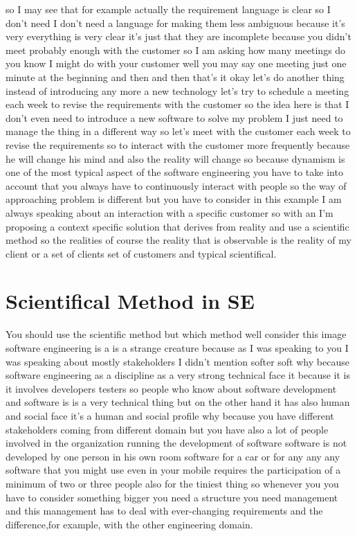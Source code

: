 \documentclass[conference, compsoc, twoside]{IEEEtran}
\begin{document}
so I may see that 
for example actually the requirement language is clear 
so I don't need I don't need a language for making them less ambiguous because it's very everything is very clear it's just that they are incomplete because you didn't meet probably enough with the customer 
so I am asking how many meetings do you know I might do with your customer well you may say one meeting just one minute at the beginning and then and then that's it okay let's do another thing instead of introducing any more a new technology let's try to schedule a meeting each week to revise the requirements with the customer so the idea here is that I don't even need to introduce a new software to solve my problem I just need to manage the thing in a different way so let's meet with the customer each week to revise the requirements so to interact with the customer more frequently because he will change his mind and also the reality will change so because dynamism is one of the most typical aspect of the software engineering you have to take into account that you always have to continuously interact with people so the way of approaching problem is different but you have to consider in this example I am always speaking about an interaction with a specific customer so with an I'm proposing a context specific solution that derives from reality and use a scientific method so the realities of course the reality that is observable is the reality of my client or a set of clients set of customers and typical scientifical. 
 \section{Scientifical Method in SE} %
 \label{sec:scientifical_method_in_se}
 You should use the scientific method but which method well consider this image software engineering is a is a strange creature because as I was speaking to you I was speaking about mostly stakeholders I didn't mention softer soft why because software engineering as a discipline as a very strong technical face it because it is it involves developers testers so people who know about software development and software is is a very technical thing but on the other hand it has also human and social face it's a human and social profile why because you have different stakeholders coming from different domain but you have also a lot of people involved in the organization running the development of software software is not developed by one person in his own room software for a car or for any any any software that you might use even in your mobile requires the participation of a minimum of two or three people also for the tiniest thing so whenever you you have to consider something bigger you need a structure you need management and this management has to deal with ever-changing requirements and the difference,for example, with the other engineering domain.
\end{document}
